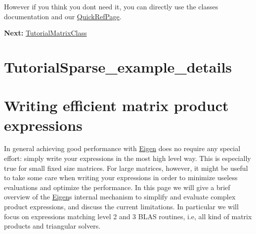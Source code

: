 However if you think you don\textquotesingle{}t need it, you can directly use the classes documentation and our \hyperlink{group___quick_ref_page}{Quick\+Ref\+Page}.

\begin{DoxyItemize}
\item {\bfseries Next\+:} \hyperlink{group___tutorial_matrix_class}{Tutorial\+Matrix\+Class} \end{DoxyItemize}
\hypertarget{TutorialSparse_example_details}{}\section{Tutorial\+Sparse\+\_\+example\+\_\+details}\label{TutorialSparse_example_details}

\begin{DoxyCodeInclude}
\end{DoxyCodeInclude}
 \hypertarget{TopicWritingEfficientProductExpression}{}\section{Writing efficient matrix product expressions}\label{TopicWritingEfficientProductExpression}
In general achieving good performance with \hyperlink{namespace_eigen}{Eigen} does no require any special effort\+: simply write your expressions in the most high level way. This is especially true for small fixed size matrices. For large matrices, however, it might be useful to take some care when writing your expressions in order to minimize useless evaluations and optimize the performance. In this page we will give a brief overview of the \hyperlink{namespace_eigen}{Eigen}\textquotesingle{}s internal mechanism to simplify and evaluate complex product expressions, and discuss the current limitations. In particular we will focus on expressions matching level 2 and 3 B\+L\+AS routines, i.\+e, all kind of matrix products and triangular solvers.

